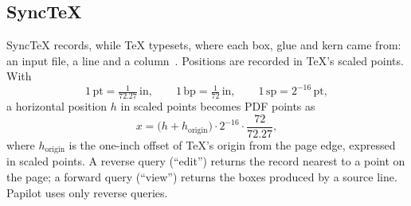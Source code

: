 \subsection{SyncTeX}

SyncTeX records, while \TeX{} typesets, where each box, glue and kern came from:
an input file, a line and a column~\cite{laurens2008}. Positions are recorded
in \TeX{}'s scaled points. With
\begin{equation}
  1\,\mathrm{pt} = \tfrac{1}{72.27}\,\mathrm{in}, \qquad
  1\,\mathrm{bp} = \tfrac{1}{72}\,\mathrm{in}, \qquad
  1\,\mathrm{sp} = 2^{-16}\,\mathrm{pt},
\end{equation}
a horizontal position $h$ in scaled points becomes PDF points as
\begin{equation}
  x = \bigl(h + h_{\text{origin}}\bigr) \cdot 2^{-16} \cdot \frac{72}{72.27},
  \label{eq:sp-to-bp}
\end{equation}
where $h_{\text{origin}}$ is the one-inch offset of \TeX{}'s origin from the
page edge, expressed in scaled points. A reverse query (``edit'') returns the
record nearest to a point on the page; a forward query (``view'') returns the
boxes produced by a source line. Papilot uses only reverse queries.
